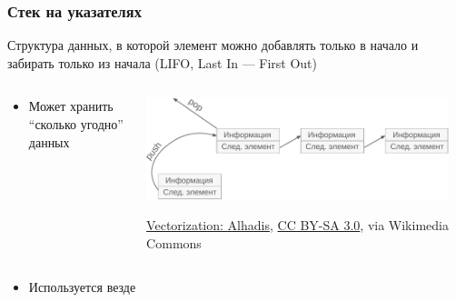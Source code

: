 \documentclass[aspectratio=169]{beamer}
\begin{document}
\begin{frame}
    \frametitle{Стек на указателях}
    Структура данных, в которой элемент можно добавлять только в начало и забирать только из начала (LIFO, Last In --- First Out)
    \begin{columns}
        \begin{small}
            \begin{column}{0.55\textwidth}
                \begin{itemize}
                    \item Может хранить \enquote{сколько угодно} данных
                          \begin{itemize}
                          \end{itemize}
                \end{itemize}
            \end{column}
        \end{small}
        \begin{column}{0.45\textwidth}
            \begin{center}
                \includegraphics[width=0.95\textwidth]{stack.pdf}
                \begin{tiny}
                    \href{https://commons.wikimedia.org/wiki/File:Stack_preview.svg}{Vectorization:  Alhadis}, \href{https://creativecommons.org/licenses/by-sa/3.0}{CC BY-SA 3.0}, via Wikimedia Commons
                \end{tiny}
            \end{center}
        \end{column}
    \end{columns}
    \begin{itemize}
        \item Используется везде

\end{itemize}
\end{frame}
\end{document}
